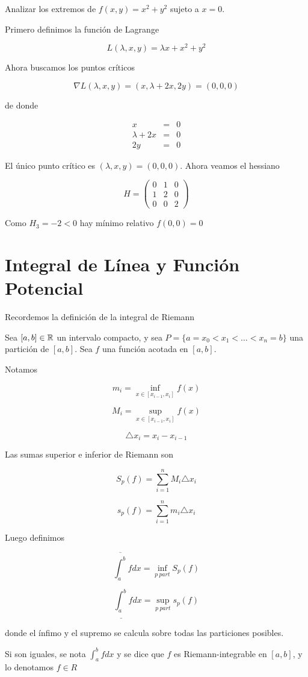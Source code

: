\begin{example}
Analizar los extremos de $f(x,y) = x^2 + y^2$ sujeto a $x=0$.

Primero definimos la función de Lagrange

$$ L(\lambda, x,y) = \lambda x + x^2 + y^2$$

Ahora buscamos los puntos críticos

$$ \nabla L(\lambda, x,y) = (x, \lambda+2x, 2y) = (0,0,0)$$

de donde

\begin{eqnarray*} x &=& 0 \\
\lambda + 2x &=& 0 \\
2y &=& 0 \end{eqnarray*}

El único punto crítico es $ (\lambda, x,y) = (0,0,0)$.  Ahora veamos el hessiano

$$ H = \begin{pmatrix} 0 & 1 & 0 \\ 1 & 2 & 0 \\ 0 & 0 & 2 \end{pmatrix} $$

Como $ H_3 = -2 < 0$ hay mínimo relativo $ f(0,0) = 0$
\end{example}



\chapter{Integral de Línea y Función Potencial}

Recordemos la definición de la integral de Riemann

\begin{definition}
Sea $[a,b] \in \mathbb{R}$ un intervalo compacto, y sea $ P = \{a = x_0 < x_1 < \ldots < x_n = b\}$ una partición de $ [a,b]$.  Sea $f$ una función acotada en $ [a,b]$.  

Notamos 

$$ m_i = \inf_{x \in [x_{i-1},x_i]} f(x) $$

$$ M_i = \sup_{x \in [x_{i-1},x_i]} f(x) $$

$$ \triangle x_i = x_i - x_{i-1}$$

Las sumas superior e inferior de Riemann son

$$ S_p(f) = \sum_{i=1}^n M_i \triangle x_i $$

$$ s_p(f) = \sum_{i=1}^n m_i \triangle x_i $$

Luego definimos

$$ \overline{\int_a^b} f dx = \inf_{p \ part} S_p(f)$$

$$ \underline{\int_a^b} f dx = \sup_{p \ part} s_p(f)$$

donde el ínfimo y el supremo se calcula sobre todas las particiones posibles.

Si son iguales, se nota $ \int_a^b f dx$ y se dice que $f$ es Riemann-integrable en $[a,b]$, y lo denotamos $f \in R$
\end{definition}

